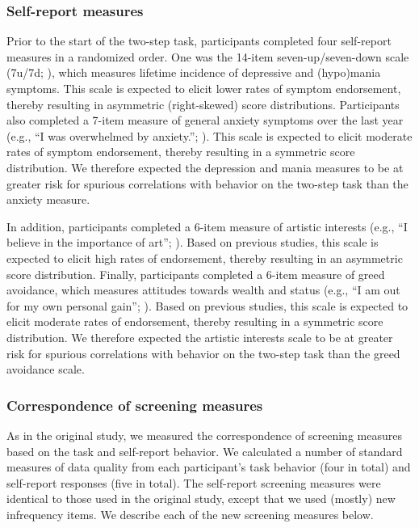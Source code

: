 \documentclass[a4paper,notitlepage,12pt]{article}
\begin{document}
\begin{refsection}[supp]
\subsubsection*{Self-report measures}

Prior to the start of the two-step task, participants completed four self-report measures in a randomized order. One was the 14-item seven-up/seven-down scale (7u/7d; \cite{youngstrom_2013_susd-2}), which measures lifetime incidence of depressive and (hypo)mania symptoms. This scale is expected to elicit lower rates of symptom endorsement, thereby resulting in asymmetric (right-skewed) score distributions. Participants also completed a 7-item measure of general anxiety symptoms over the last year (e.g., ``I was overwhelmed by anxiety.''; \cite{watson2022development}). This scale is expected to elicit moderate rates of symptom endorsement, thereby resulting in a symmetric score distribution. We therefore expected the depression and mania measures to be at greater risk for spurious correlations with behavior on the two-step task than the anxiety measure. 

In addition, participants completed a 6-item measure of artistic interests (e.g., ``I believe in the importance of art''; \cite{ashton2007empirical}). Based on previous studies, this scale is expected to elicit high rates of endorsement, thereby resulting in an asymmetric score distribution. Finally, participants completed a 6-item measure of greed avoidance, which measures attitudes towards wealth and status (e.g., ``I am out for my own personal gain''; \cite{ashton2007empirical}). Based on previous studies, this scale is expected to elicit moderate rates of endorsement, thereby resulting in a symmetric score distribution. We therefore expected the artistic interests scale to be at greater risk for spurious correlations with behavior on the two-step task than the greed avoidance scale. 

\subsubsection*{Correspondence of screening measures}

As in the original study, we measured the correspondence of screening measures based on the task and self-report behavior. We calculated a number of standard measures of data quality from each participant's task behavior (four in total) and self-report responses (five in total). The self-report screening measures were identical to those used in the original study, except that we used (mostly) new infrequency items. We describe each of the new screening measures below.


\end{refsection}
\end{document}
